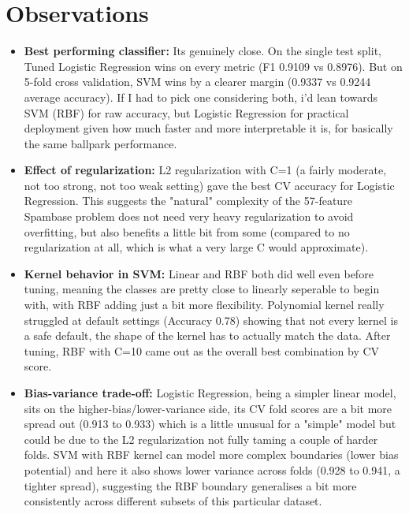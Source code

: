 \documentclass[12pt,a4paper]{article}
\begin{document}
\section{Observations}
\begin{itemize}
\item \textbf{Best performing classifier:} Its genuinely close. On the single test split, Tuned Logistic Regression wins on every metric (F1 0.9109 vs 0.8976). But on 5-fold cross validation, SVM wins by a clearer margin (0.9337 vs 0.9244 average accuracy). If I had to pick one considering both, i'd lean towards SVM (RBF) for raw accuracy, but Logistic Regression for practical deployment given how much faster and more interpretable it is, for basically the same ballpark performance.
\item \textbf{Effect of regularization:} L2 regularization with C=1 (a fairly moderate, not too strong, not too weak setting) gave the best CV accuracy for Logistic Regression. This suggests the "natural" complexity of the 57-feature Spambase problem does not need very heavy regularization to avoid overfitting, but also benefits a little bit from some (compared to no regularization at all, which is what a very large C would approximate).
\item \textbf{Kernel behavior in SVM:} Linear and RBF both did well even before tuning, meaning the classes are pretty close to linearly seperable to begin with, with RBF adding just a bit more flexibility. Polynomial kernel really struggled at default settings (Accuracy 0.78) showing that not every kernel is a safe default, the shape of the kernel has to actually match the data. After tuning, RBF with C=10 came out as the overall best combination by CV score.
\item \textbf{Bias-variance trade-off:} Logistic Regression, being a simpler linear model, sits on the higher-bias/lower-variance side, its CV fold scores are a bit more spread out (0.913 to 0.933) which is a little unusual for a "simple" model but could be due to the L2 regularization not fully taming a couple of harder folds. SVM with RBF kernel can model more complex boundaries (lower bias potential) and here it also shows lower variance across folds (0.928 to 0.941, a tighter spread), suggesting the RBF boundary generalises a bit more consistently across different subsets of this particular dataset.
\end{itemize}
\end{document}
